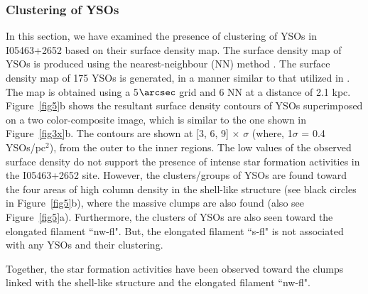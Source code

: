 \documentclass[iop]{emulateapj}
\begin{document}
\subsubsection{Clustering of YSOs}
\label{subsec:srf}
%
In this section, we have examined the presence of clustering of YSOs in I05463+2652 based on their surface density map. 
The surface density map of YSOs is produced using the nearest-neighbour (NN) method \citep[see][for more details]{gutermuth09,bressert10}. 
The surface density map of 175 YSOs is generated, in a manner similar to that utilized in \citet{dewangan15}. 
The map is obtained using a 5$\arcsec$ grid and 6 NN at a distance of 2.1 kpc. 
Figure~\ref{fig5}b shows the resultant surface density contours of YSOs superimposed on a two color-composite image, 
which is similar to the one shown in Figure~\ref{fig3x}b. 
The contours are shown at [3, 6, 9] $\times$ $\sigma$ (where, 1$\sigma$ = 0.4 YSOs/pc$^{2}$), from the 
outer to the inner regions. 
The low values of the observed surface density do not support the presence of intense star formation activities in the I05463+2652 site.
However, the clusters/groups of YSOs are found toward the four areas of high column density in the shell-like structure (see black circles in Figure~\ref{fig5}b), where the massive clumps are also found (also see Figure~\ref{fig5}a).  
Furthermore, the clusters of YSOs are also seen toward the elongated filament ``nw-fl".
But, the elongated filament ``s-fl" is not associated with any YSOs and their clustering.

Together, the star formation activities have been observed toward the clumps linked with the shell-like structure and 
the elongated filament ``nw-fl".
%
\end{document}
